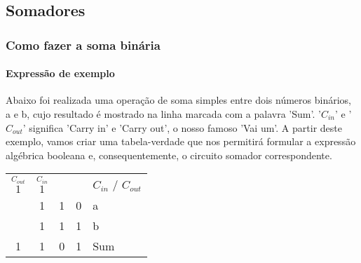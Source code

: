 \subsection{Somadores}
\begin{frame}
	\frametitle{Como fazer a soma binária}
	\framesubtitle{Expressão de exemplo}
	\par Abaixo foi realizada uma operação de soma simples entre dois números binários, a e b, cujo resultado é mostrado na linha marcada com a palavra 'Sum'. '$C_{in}$' e '$C_{out}$' significa 'Carry in' e 'Carry out', o nosso famoso 'Vai um'. A partir deste exemplo, vamos criar uma tabela-verdade que nos permitirá formular a expressão algébrica booleana e, consequentemente, o circuito somador correspondente.
	
	\begin{table}[h!]
		\centering
		\begin{tabular}{cccc>{\centering\arraybackslash}p{2cm}}
		  $\overset{C_{out}}{1}$ & $\overset{C_{in}}{1}$ & & & $C_{in}$ / $C_{out}$ \\ \cline{1-4}
			& 1 & 1 & 0 & a \\ 
			& 1 & 1 & 1 & b \\ \cline{1-4}
			1 & 1 & 0 & 1 & Sum \\
		\end{tabular}
	\end{table}
	
\end{frame}

